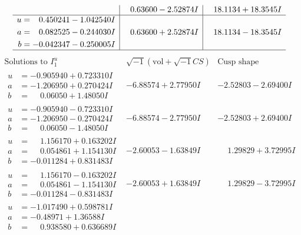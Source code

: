 \documentclass[1p]{elsarticle_modified}
\theoremstyle{definition}
\newcommand{\I}{\sqrt{-1}}
\begin{document}
$$\begin{array}{c|c|c}
 & \phantom{-}0.63600 - 2.52874 I & \phantom{-}18.1134 + 18.3545 I \\ \hline\begin{aligned}
u &= \phantom{-}0.450241 - 1.042540 I \\
a &= \phantom{-}0.082525 - 0.244030 I \\
b &= -0.042347 - 0.250005 I\end{aligned}
 & \phantom{-}0.63600 + 2.52874 I & \phantom{-}18.1134 - 18.3545 I\\
 \hline 
 \end{array}$$\newpage$$\begin{array}{c|c|c}  
\text{Solutions to }I^u_{1}& \I (\text{vol} + \sqrt{-1}CS) & \text{Cusp shape}\\
 \hline 
\begin{aligned}
u &= -0.905940 + 0.723310 I \\
a &= -1.206950 + 0.270424 I \\
b &= \phantom{-}0.06050 + 1.48050 I\end{aligned}
 & -6.88574 + 2.77950 I & -2.52803 - 2.69400 I \\ \hline\begin{aligned}
u &= -0.905940 - 0.723310 I \\
a &= -1.206950 - 0.270424 I \\
b &= \phantom{-}0.06050 - 1.48050 I\end{aligned}
 & -6.88574 - 2.77950 I & -2.52803 + 2.69400 I \\ \hline\begin{aligned}
u &= \phantom{-}1.156170 + 0.163202 I \\
a &= \phantom{-}0.054861 + 1.154130 I \\
b &= -0.011284 + 0.831483 I\end{aligned}
 & -2.60053 - 1.63849 I & \phantom{-}1.29829 + 3.72995 I \\ \hline\begin{aligned}
u &= \phantom{-}1.156170 - 0.163202 I \\
a &= \phantom{-}0.054861 - 1.154130 I \\
b &= -0.011284 - 0.831483 I\end{aligned}
 & -2.60053 + 1.63849 I & \phantom{-}1.29829 - 3.72995 I \\ \hline\begin{aligned}
u &= -1.017490 + 0.598781 I \\
a &= -0.48971 + 1.36588 I \\
b &= \phantom{-}0.938580 + 0.636689 I\end{aligned}

\end{array}$$
\end{document}
